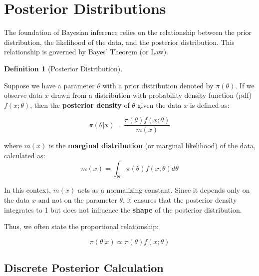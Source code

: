 \documentclass[
  letterpaper,
  DIV=11,
  numbers=noendperiod]{scrreprt}
\renewcommand{\[}{\begin{equation}}
\renewcommand{\]}{\end{equation}}
\theoremstyle{definition}
\newtheorem{definition}{Definition}[chapter]
\theoremstyle{plain}
\theoremstyle{plain}
\theoremstyle{plain}
\theoremstyle{definition}
\theoremstyle{plain}
\theoremstyle{remark}
\begin{document}
\section{Posterior Distributions}\label{posterior-distributions}

The foundation of Bayesian inference relies on the relationship between
the prior distribution, the likelihood of the data, and the posterior
distribution. This relationship is governed by Bayes' Theorem (or Law).

\begin{definition}[Posterior
Distribution]\protect\hypertarget{def-posterior}{}\label{def-posterior}

Suppose we have a parameter \(\theta\) with a prior distribution denoted
by \(\pi(\theta)\). If we observe data \(x\) drawn from a distribution
with probability density function (pdf) \(f(x; \theta)\), then the
\textbf{posterior density} of \(\theta\) given the data \(x\) is defined
as:

\[
\pi(\theta|x) = \frac{\pi(\theta) f(x;\theta)}{m(x)}
\]

where \(m(x)\) is the \textbf{marginal distribution} (or marginal
likelihood) of the data, calculated as: \[
m(x) = \int_{\Theta} \pi(\theta) f(x;\theta) d\theta
\]

In this context, \(m(x)\) acts as a normalizing constant. Since it
depends only on the data \(x\) and not on the parameter \(\theta\), it
ensures that the posterior density integrates to 1 but does not
influence the \textbf{shape} of the posterior distribution.

Thus, we often state the proportional relationship:

\[
\pi(\theta|x) \propto \pi(\theta) f(x;\theta)
\]

\end{definition}

\subsection{Discrete Posterior
Calculation}\label{discrete-posterior-calculation}
\end{document}
